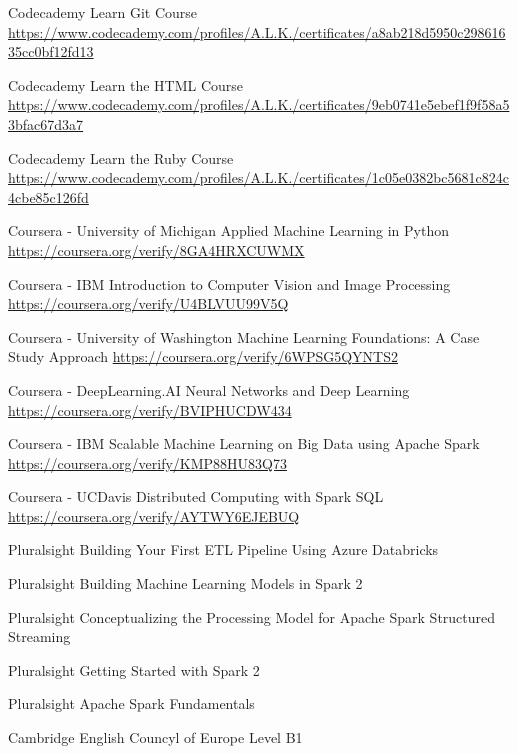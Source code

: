 \documentclass[%
               doublesided,
               paper=a4,
               fontsize=10pt
              ]{my-resume}
\begin{document}
{Codecademy}
{Learn Git Course}
{\url{https://www.codecademy.com/profiles/A.L.K./certificates/a8ab218d5950c29861635cc0bf12fd13}}

{Codecademy}
{Learn the HTML Course}
{\url{https://www.codecademy.com/profiles/A.L.K./certificates/9eb0741e5ebef1f9f58a53bfac67d3a7}}

{Codecademy}
{Learn the Ruby Course}
{\url{https://www.codecademy.com/profiles/A.L.K./certificates/1c05e0382bc5681c824c4cbe85c126fd}}

{Coursera - University of Michigan}
{Applied Machine Learning in Python}
{\url{https://coursera.org/verify/8GA4HRXCUWMX}}

{Coursera - IBM}
{Introduction to Computer Vision and Image Processing}
{\url{https://coursera.org/verify/U4BLVUU99V5Q}}

{Coursera - University of Washington}
{Machine Learning Foundations: A Case Study Approach}
{\url{https://coursera.org/verify/6WPSG5QYNTS2}}

{Coursera - DeepLearning.AI}
{Neural Networks and Deep Learning}
{\url{https://coursera.org/verify/BVIPHUCDW434}}

{Coursera - IBM}
{Scalable Machine Learning on Big Data using Apache Spark}
{\url{https://coursera.org/verify/KMP88HU83Q73}}

{Coursera - UCDavis}
{Distributed Computing with Spark SQL}
{\url{https://coursera.org/verify/AYTWY6EJEBUQ}}

{Pluralsight}
{Building Your First ETL Pipeline Using Azure Databricks}

{Pluralsight}
{Building Machine Learning Models in Spark 2}

{Pluralsight}
{Conceptualizing the Processing Model for Apache Spark Structured Streaming}

{Pluralsight}
{Getting Started with Spark 2}

{Pluralsight}
{Apache Spark Fundamentals}

{Cambridge English}
{Councyl of Europe Level B1}

\makebody
\end{document}
